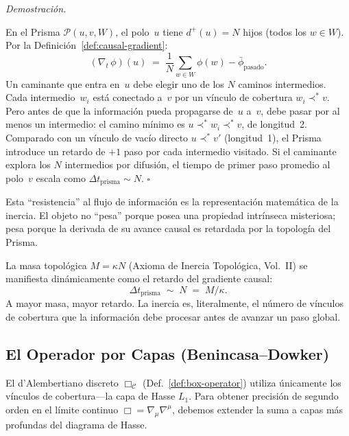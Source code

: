 \documentclass[11pt, a4paper, openany]{book}
\newcommand{\covers}{\prec^{\!*}}
\renewenvironment{proof}[1][Demostraci\'on]{%
  \par\noindent\textit{#1.}\quad
}{\hfill$\square$\par\medskip}
\begin{document}
\begin{proof}
En el Prisma $\mathcal{P}(u,v,W)$, el polo~$u$ tiene $d^+(u) = N$
hijos (todos los $w \in W$). Por la
Definici\'on~\ref{def:causal-gradient}:
\[
  (\nabla_t\,\phi)(u)
  \;=\;
  \frac{1}{N}\sum_{w \in W}\phi(w) - \bar{\phi}_{\text{pasado}}.
\]
Un caminante que entra en~$u$ debe elegir uno de los $N$ caminos
intermedios. Cada intermedio~$w_i$ est\'a conectado a~$v$ por un
v\'inculo de cobertura $w_i \covers v$. Pero antes de que la
informaci\'on pueda propagarse de~$u$ a~$v$, debe pasar por al menos
un intermedio: el camino m\'inimo es
$u \covers w_i \covers v$, de longitud~2. Comparado con un
v\'inculo de vac\'io directo $u \covers v'$ (longitud~1), el
Prisma introduce un retardo de $+1$ paso por cada intermedio
visitado. Si el caminante explora los $N$ intermedios por difusi\'on,
el tiempo de primer paso promedio al polo~$v$ escala como $\Delta
t_{\text{prisma}} \sim N$.
\end{proof}

\noindent
Esta ``resistencia'' al flujo de informaci\'on es la representaci\'on
matem\'atica de la inercia. El objeto no ``pesa'' porque posea una
propiedad intr\'inseca misteriosa; pesa porque la derivada de su
avance causal es retardada por la topolog\'ia del Prisma.

\begin{result}[title={La Derivada de la Inercia}]
\label{res:inertia-derivative}
La masa topol\'ogica $M = \kappa N$
(Axioma de Inercia Topol\'ogica, Vol.~II) se manifiesta
din\'amicamente como el retardo del gradiente causal:
\[
  \Delta t_{\text{prisma}} \;\sim\; N \;=\; M/\kappa.
\]
A mayor masa, mayor retardo. La inercia es, literalmente, el n\'umero
de v\'inculos de cobertura que la informaci\'on debe procesar antes de
avanzar un paso global.
\end{result}

\subsection{El Operador por Capas (Benincasa--Dowker)}

El d'Alembertiano discreto $\Box_{\mathcal{C}}$
(Def.~\ref{def:box-operator}) utiliza \'unicamente los v\'inculos de
cobertura---la capa de Hasse $L_1$.  Para obtener precisi\'on de segundo
orden en el l\'imite continuo $\Box = \nabla_\mu \nabla^\mu$, debemos
extender la suma a capas m\'as profundas del diagrama de Hasse.
\end{document}

